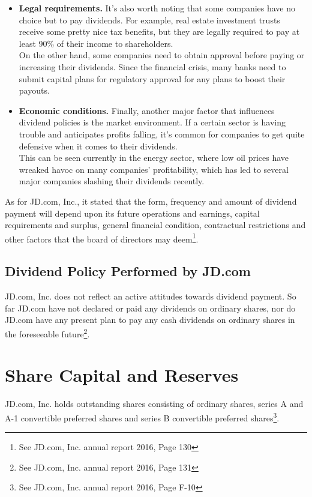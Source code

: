 \begin{itemize}
	\item \textbf{Legal requirements.} 
	It's also worth noting that some companies have no choice but to pay dividends. For example, real estate investment trusts receive some pretty nice tax benefits, but they are legally required to pay at least 90\% of their income to shareholders.\\
	On the other hand, some companies need to obtain approval before paying or increasing their dividends. Since the financial crisis, many banks need to submit capital plans for regulatory approval for any plans to boost their payouts.
	
	\item \textbf{Economic conditions.}
	Finally, another major factor that influences dividend policies is the market environment. If a certain sector is having trouble and anticipates profits falling, it's common for companies to get quite defensive when it comes to their dividends.\\	
	This can be seen currently in the energy sector, where low oil prices have wreaked havoc on many companies' profitability, which has led to several major companies slashing their dividends recently.
\end{itemize}

As for JD.com, Inc., it stated that the form, frequency and amount of dividend payment will depend upon its future operations and earnings, capital requirements and surplus, general financial condition, contractual restrictions and other factors that the board of directors may deem\footnote{See JD.com, Inc. annual report 2016, Page 130}.


\subsection{Dividend Policy Performed by JD.com}
JD.com, Inc. does not reflect an active attitudes towards dividend payment. So far JD.com have not declared or paid any dividends on ordinary shares, nor do JD.com have any present plan to pay any cash dividends on ordinary shares in the foreseeable future\footnote{See JD.com, Inc. annual report 2016, Page 131}.


\section{Share Capital and Reserves}

JD.com, Inc. holds outstanding shares consisting of ordinary shares, series A and A-1 convertible preferred shares and series B convertible preferred shares\footnote{See JD.com, Inc. annual report 2016, Page F-10}.

